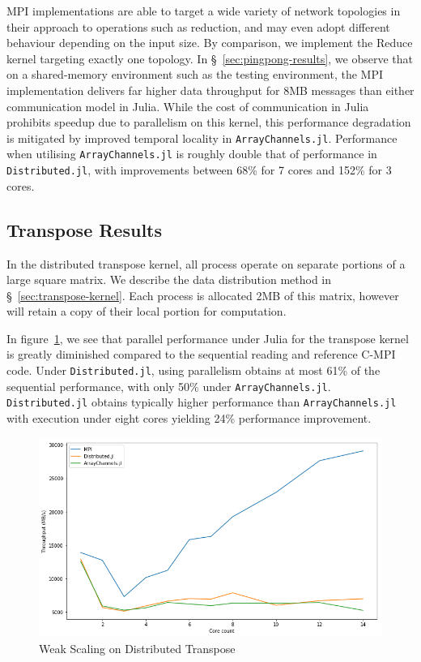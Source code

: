 \documentclass{juliacon}
\begin{document}
MPI implementations are able to target a wide variety of network
topologies in their approach to operations such as reduction, and may
even adopt different behaviour depending on the input size. By
comparison, we implement the Reduce kernel targeting exactly one
topology. In \S~\ref{sec:pingpong-results}, we observe that on a
shared-memory environment such as the testing environment, the MPI
implementation delivers far higher data throughput for 8MB messages than
either communication model in Julia. While the cost of communication in
Julia prohibits speedup due to parallelism on this kernel, this
performance degradation is mitigated by improved temporal locality in
\texttt{ArrayChannels.jl}. Performance when utilising \texttt{ArrayChannels.jl} is roughly double that of performance in \texttt{Distributed.jl}, with improvements between 68\% for 7 cores and 152\% for 3 cores.

\subsection{Transpose Results}
\label{sec:transpose-results}

In the distributed transpose kernel, all process operate on separate
portions of a large square matrix. We describe the data distribution
method in \S~\ref{sec:transpose-kernel}. Each process is allocated
2MB of this matrix, however will retain a copy of their local portion
for computation.

In figure~\ref{fig:plot-transpose}, we see that parallel performance
under Julia for the transpose kernel is greatly diminished compared to
the sequential reading and reference C-MPI code. Under
\texttt{Distributed.jl}, using parallelism obtains at most 61\% of the
sequential performance, with only 50\% under \texttt{ArrayChannels.jl}.
\texttt{Distributed.jl} obtains typically higher performance than
\texttt{ArrayChannels.jl} with execution under eight cores yielding 24\%
performance improvement.

\begin{figure}[htb]
	\includegraphics[width=\linewidth]{figs/transpose.png}
	\caption{Weak Scaling on Distributed Transpose}
	\label{fig:plot-transpose}
\end{figure}
\end{document}
